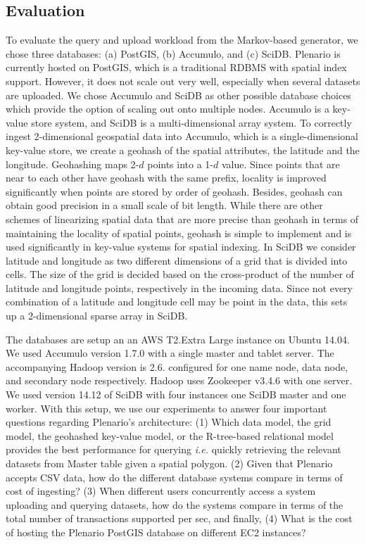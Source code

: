 \documentclass[11pt]{article}
\begin{document}
\subsection{Evaluation}
To evaluate the query and upload workload from the Markov-based generator, we chose three databases: (a) PostGIS, (b) Accumulo, and (c) SciDB. Plenario is currently hosted on PostGIS, which is a traditional RDBMS with spatial index support. However, it does not scale out very well, especially when several datasets are uploaded. We chose Accumulo and SciDB as other possible database choices which provide the option of scaling out onto multiple nodes. Accumulo is a key-value store system, and SciDB is a multi-dimensional array system. To correctly ingest 2-dimensional geospatial data into Accumulo, which is a single-dimensional key-value store, we create a geohash of the spatial attributes, the latitude and the longitude. Geohashing maps 2-$d$ points into a 1-$d$ value. Since points that are near to each other have geohash with the same prefix, locality is improved significantly when points are stored by order of geohash. 
Besides, geohash can obtain good precision in a small scale of bit length. While there are other schemes of linearizing spatial data that are more precise than geohash in terms of maintaining the locality of spatial points, geohash is simple to implement and is used significantly in key-value systems for spatial indexing. In SciDB we consider latitude and longitude as two different dimensions of a grid that is divided into cells. The size of the grid is decided based on the cross-product of the number of latitude and longitude points, respectively in the incoming data. Since not every combination of a latitude and longitude cell may be point in the data, this sets up a 2-dimensional sparse array in SciDB. 

The databases are setup an an AWS T2.Extra Large instance on Ubuntu 14.04. We used Accumulo version 1.7.0 with a single master and tablet server. The accompanying Hadoop version is 2.6. configured for one name node, data node, and secondary node respectively. Hadoop uses Zookeeper v3.4.6 with one server. We used version 14.12 of SciDB with four instances one SciDB master and one worker. With this setup, we use our experiments to answer four important questions regarding Plenario's architecture: (1) Which data model, the grid model, the geohashed key-value model, or the R-tree-based relational model provides the best performance for querying \emph{i.e.} quickly retrieving the relevant datasets from Master table given a spatial polygon. (2) Given that Plenario accepts CSV data, how do the different database systems compare in terms of cost of ingesting? (3) When different users concurrently access a system uploading and querying datasets, how do the systems compare in terms of the total number of transactions supported per sec, and finally, (4) What is the cost of hosting the Plenario PostGIS database on different EC2 instances?
\end{document}
